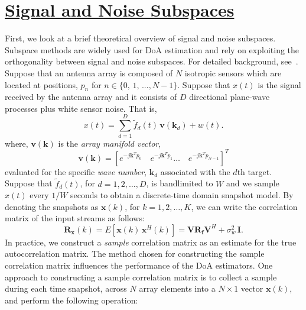 \documentclass[a4paper, 11pt]{article}
\begin{document}
\section*{\underline{Signal and Noise Subspaces}}
First, we look at a brief theoretical overview of signal and noise subspaces. Subspace methods are widely used for DoA estimation and rely on exploiting the orthogonality between signal and noise subspaces. For detailed background, see~\cite{trees}. Suppose that an antenna array is composed of $N$ isotropic sensors which are located at positions, $p_n$ for $n\in\{0,\,1,\,...,N-1\}$. Suppose that $x(t)$ is the signal received by the antenna array and it consists of $D$ directional plane-wave processes plus white sensor noise. That is, 
\begin{equation*}
x(t) = \sum_{d=1}^{D}\tilde{f}_d(t)\,\mathbf{v}(\mathbf{k}_d)+w(t). 
\end{equation*}
where, $\mathbf{v}(\mathbf{k})$ is the \textit{array manifold vector},
\begin{equation}
\mathbf{v(k)}=\left[e^{-j\mathbf{k}^T p_0}\quad e^{-j\mathbf{k}^T p_1}\hdots\quad e^{-j\mathbf{k}^T p_{N-1}}\right]^T
\label{amv}
\end{equation}
evaluated for the specific \textit{wave number}\footnotemark{}, $\mathbf{k}_d$ associated with the $d$th target. Suppose that $\tilde{f}_d(t)$, for $d=1,2,\hdots,D$, is bandlimited to $W$ and we sample $x(t)$ every $1/W$ seconds to obtain a discrete-time domain snapshot model. By denoting the snapshots as $\mathbf{x}(k)$, for $k=1,2,\hdots,K$, we can write the correlation matrix of the input streams as follows:
\begin{equation}
\mathbf{R}_{\mathbf{x}}(k) = E\left[\mathbf{x}(k)\,\mathbf{x}^H(k)\right] = \mathbf{V}\mathbf{R_f}\mathbf{V}^H+\sigma_w^2\,\mathbf{I}. 
\label{cov_mat1}
\end{equation}
In practice, we construct a \textit{sample} correlation matrix as an estimate for the true autocorrelation matrix. The method chosen for constructing the sample correlation matrix influences the performance of the DoA estimators. One approach to constructing a sample correlation matrix is to collect a sample during each time snapshot, across $N$ array elements into a $N\times 1$ vector $\mathbf{x}(k)$, and perform the following operation:
\end{document}
